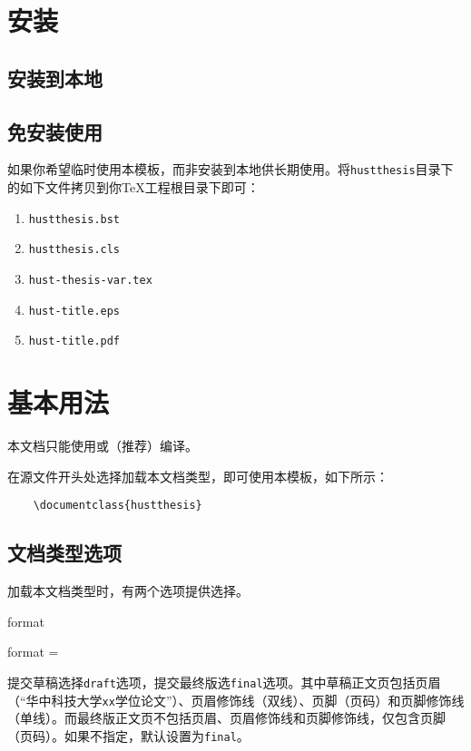 \documentclass[12pt,a4paper,numbered,full]{l3doc}
\def\orvar{\textnormal{|}}
\begin{document}
\section{安装}

\subsection{安装到本地}


\subsection{免安装使用}

如果你希望临时使用本模板，而非安装到本地供长期使用。将\verb+hustthesis+目录下的如下文件拷贝到你\TeX{}工程根目录下即可：
\begin{enumerate}
    \item \verb+hustthesis.bst+
    \item \verb+hustthesis.cls+
    \item \verb+hust-thesis-var.tex+
    \item \verb+hust-title.eps+
    \item \verb+hust-title.pdf+
\end{enumerate}

\section{基本用法}

\begin{importantnote}
本文档只能使用\textnormal{\XeLaTeX}或\textnormal{\LuaLaTeX}（推荐）编译。
\end{importantnote}

在源文件开头处选择加载本文档类型，即可使用本模板，如下所示：
\begin{verbatim}
    \documentclass{hustthesis}
\end{verbatim}

\subsection{文档类型选项}

加载本文档类型时，有两个选项提供选择。

\begin{function}{format}
    \begin{syntax}
        format = \meta{draft\orvar{}\textbf{final}}
    \end{syntax}
    提交草稿选择\verb+draft+选项，提交最终版选\verb+final+选项。其中草稿正文页包括页眉（“华中科技大学\verb+xx+学位论文”）、页眉修饰线（双线）、页脚（页码）和页脚修饰线（单线）。而最终版正文页不包括页眉、页眉修饰线和页脚修饰线，仅包含页脚（页码）。如果不指定，默认设置为\verb+final+。
\end{function}
\end{document}
